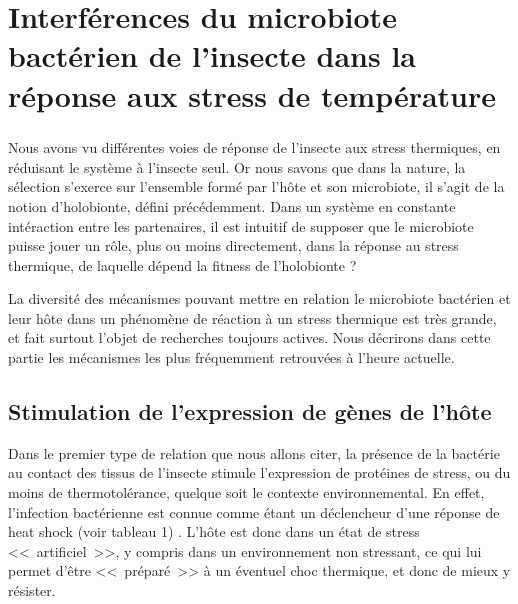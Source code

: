 \chapter{Interférences du microbiote bactérien de l’insecte dans la réponse aux stress de température} %

\paragraph*{}
Nous avons vu différentes voies de réponse de l'insecte aux stress thermiques, en réduisant le système à l'insecte seul.
Or nous savons que dans la nature, la sélection s'exerce sur l'ensemble formé par l'hôte et son microbiote, il s'agit de la notion d'holobionte, défini précédemment.
Dans un système en constante intéraction entre les partenaires, il est intuitif de supposer que le microbiote puisse jouer un rôle, plus ou moins directement, dans la réponse au stress thermique, de laquelle dépend la fitness de l'holobionte ?

La diversité des mécanismes pouvant mettre en relation le microbiote bactérien et leur hôte dans un phénomène de réaction à un stress thermique est très grande, et fait surtout l'objet de recherches toujours actives.
Nous décrirons dans cette partie les mécanismes les plus fréquemment retrouvées à l'heure actuelle.

\section{Stimulation de l'expression de gènes de l'hôte}

Dans le premier type de relation que nous allons citer, la présence de la bactérie au contact des tissus de l'insecte stimule l'expression de protéines de stress, ou du moins de thermotolérance, quelque soit le contexte environnemental.
En effet, l'infection bactérienne est connue comme étant un déclencheur d'une réponse de heat shock (voir tableau 1) \cite{deitch1995}.
L'hôte est donc dans un état de stress <<~artificiel~>>, y compris dans un environnement non stressant, ce qui lui permet d'être <<~préparé~>> à un éventuel choc thermique, et donc de mieux y résister.

